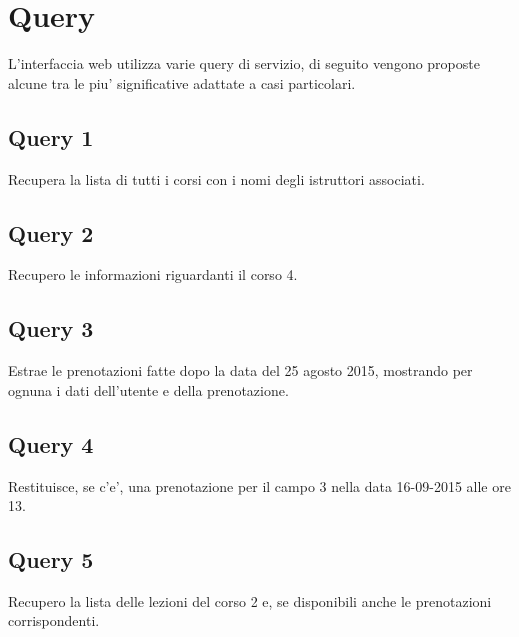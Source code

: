 \chapter{Query} 
L'interfaccia web utilizza varie query di servizio, di seguito vengono proposte alcune tra le piu' significative adattate a casi particolari.

\section{Query 1}

Recupera la lista di tutti i corsi con i nomi degli istruttori associati.\\



\section{Query 2}

Recupero le informazioni riguardanti il corso 4.\\



\section{Query 3}

Estrae le prenotazioni fatte dopo la data del 25 agosto 2015, mostrando per ognuna i dati dell'utente e della prenotazione.\\



\section{Query 4}
Restituisce, se c'e', una prenotazione per il campo 3 nella data 16-09-2015 alle ore 13.\\



\section{Query 5}
Recupero la lista delle lezioni del corso 2 e, se disponibili  anche le prenotazioni corrispondenti.\\

